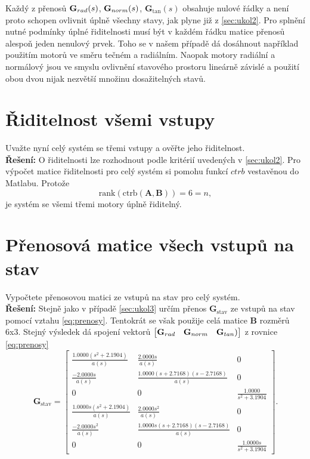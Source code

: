 \documentclass[twoside]{article}
\begin{document}
Každý z přenosů $\mathbf{G}_{rad}(s)$, $\mathbf{G}_{norm}(s)$, $\mathbf{G}_\tan(s)$ obsahuje nulové řádky a není proto schopen ovlivnit 
úplně všechny stavy, jak plyne již z \ref{sec:ukol2}. Pro splnění nutné podmínky úplné řiditelnosti musí být v 
každém řádku matice přenosů alespoň jeden nenulový prvek. Toho se v našem případě dá dosáhnout
například použitím motorů ve směru tečném a radiálním. Naopak motory radiální a normálový jsou ve smyslu ovlivnění
stavového prostoru lineárně závislé a použití obou dvou nijak nezvětší množinu dosažitelných stavů.

\section{Řiditelnost všemi vstupy}
\label{sec:ukol4}
Uvažte nyní celý systém se třemi vstupy a ověřte jeho řiditelnost. \\
\textbf{Řešení:}
O řiditelnosti lze rozhodnout podle kritérií uvedených v \ref{sec:ukol2}.
Pro výpočet  matice řiditelnosti pro celý systém si pomohu funkcí $ctrb$ vestavěnou do Matlabu. Protože
\begin{equation*}
	\text{rank}(\text{ctrb}(\mathbf{A}, \mathbf{B})) = 6 = n,
\end{equation*}
je systém se všemi třemi motory úplně řiditelný.

\section{Přenosová matice všech vstupů na stav}
\label{sec:ukol5}
Vypočtete přenosovou matici ze vstupů na stav pro celý systém.\\
\textbf{Řešení:}
Stejně jako v případě \ref{sec:ukol3} určím přenos $\mathbf{G}_{\text{stav}}$ ze vstupů na stav pomocí vztahu \eqref{eq:prenosy}.
Tentokrát se však použije celá matice $\mathbf{B}$ rozměrů 6x3. Stejný výsledek dá spojení vektorů $\begin{bmatrix}
	\mathbf{G}_{rad} & \mathbf{G}_{norm} & \mathbf{G}_{tan})
\end{bmatrix}$ z rovnice \eqref{eq:prenosy}
\begin{equation*}
	\mathbf{G}_\text{stav} = \begin{bmatrix}
	\frac{1.0000(s^2+2.1904)     }{a(s)} 	&\frac{2.0000s}{a(s)}                     & 0                             \\
	\frac{-2.0000s        }{a(s)}        	&\frac{1.0000(s+2.7168)(s-2.7168) }{a(s)} & 0                             \\
	0                                    	&0                                        & \frac{1.0000}{s^2+3.1904}     \\
	\frac{1.0000s(s^2+2.1904)}{a(s)}     	&\frac{2.0000s^2                  }{a(s)} & 0                             \\
	\frac{-2.0000s^2}{a(s)}              	&\frac{1.0000s(s+2.7168)(s-2.7168)}{a(s)} & 0                             \\
	0                                    	&0                                        & \frac{1.0000s}{s^2+3.1904}    
	\end{bmatrix}.
\end{equation*}
\end{document}
